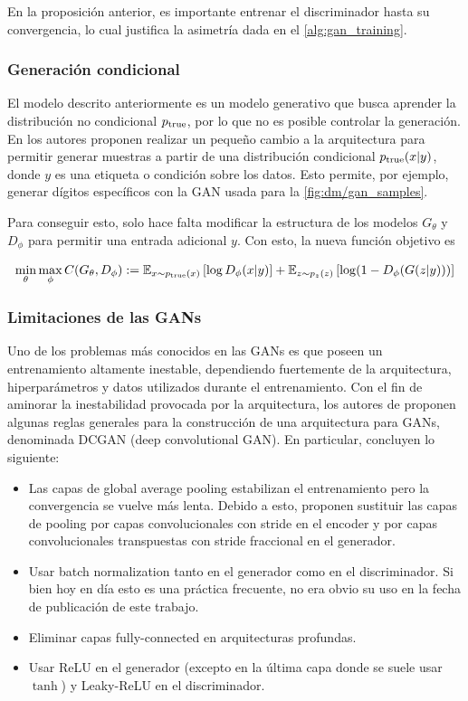 En la proposición anterior, es importante entrenar el discriminador hasta su convergencia, lo cual justifica la asimetría dada en el \autoref{alg:gan_training}.

\subsubsection{Generación condicional}

El modelo descrito anteriormente es un modelo generativo que busca aprender la distribución no condicional $p_{\operatorname{true}}$, por lo que no es posible controlar la generación. En \cite{mirza2014conditional} los autores proponen realizar un pequeño cambio a la arquitectura para  permitir generar muestras a partir de una distribución condicional $p_{\operatorname{true}}(x|y)$, donde $y$ es una etiqueta o condición sobre los datos. Esto permite, por ejemplo, generar dígitos específicos con la GAN usada para la \autoref{fig:dm/gan_samples}.

Para conseguir esto, solo hace falta modificar la estructura de los modelos $G_\theta$ y $D_\phi$ para permitir una entrada adicional $y$. Con esto, la nueva función objetivo es

\begin{equation*}
	\min_\theta\max_\phi C(G_\theta, D_\phi) := \mathbb{E}_{x\sim p_{\operatorname{true}}(x)}\left[\log D_\phi(x|y)\right] + \mathbb{E}_{z\sim p_z(z)}\left[\log (1-D_\phi(G(z|y)))\right]
\end{equation*}

\subsubsection{Limitaciones de las GANs}

Uno de los problemas más conocidos en las GANs es que poseen un entrenamiento altamente inestable, dependiendo fuertemente de la arquitectura, hiperparámetros y datos utilizados durante el entrenamiento. Con el fin de aminorar la inestabilidad provocada por la arquitectura, los autores de \cite{radford2016unsupervised} proponen algunas reglas generales para la construcción de una arquitectura para GANs, denominada DCGAN (deep convolutional GAN). En particular, concluyen lo siguiente:

\begin{itemize}
	\item Las capas de global average pooling estabilizan el entrenamiento pero la convergencia se vuelve más lenta. Debido a esto, proponen sustituir las capas de pooling por capas convolucionales con stride en el encoder y por capas convolucionales transpuestas con stride fraccional en el generador.
	\item Usar batch normalization \cite{ioffe2015batch} tanto en el generador como en el discriminador. Si bien hoy en día esto es una práctica frecuente, no era obvio su uso en la fecha de publicación de este trabajo.
	\item Eliminar capas fully-connected en arquitecturas profundas.
	\item Usar ReLU en el generador (excepto en la última capa donde se suele usar $\tanh$) y Leaky-ReLU en el discriminador.
\end{itemize}

